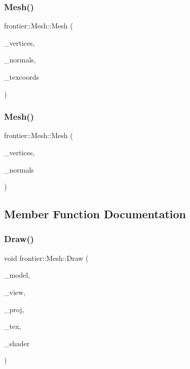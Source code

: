 \subsubsection{\texorpdfstring{Mesh()}{Mesh()}\hspace{0.1cm}{\footnotesize\ttfamily [1/2]}}
{\footnotesize\ttfamily frontier\+::\+Mesh\+::\+Mesh (\begin{DoxyParamCaption}\item[{std\+::vector$<$ G\+Lfloat $>$}]{\+\_\+vertices,  }\item[{std\+::vector$<$ G\+Lfloat $>$}]{\+\_\+normals,  }\item[{std\+::vector$<$ G\+Lfloat $>$}]{\+\_\+texcoords }\end{DoxyParamCaption})}

\mbox{\label{classfrontier_1_1_mesh_a5bc251528ec00975e49ba3f156955a3f}} 
\subsubsection{\texorpdfstring{Mesh()}{Mesh()}\hspace{0.1cm}{\footnotesize\ttfamily [2/2]}}
{\footnotesize\ttfamily frontier\+::\+Mesh\+::\+Mesh (\begin{DoxyParamCaption}\item[{std\+::vector$<$ G\+Lfloat $>$}]{\+\_\+vertices,  }\item[{std\+::vector$<$ G\+Lfloat $>$}]{\+\_\+normals }\end{DoxyParamCaption})}



\subsection{Member Function Documentation}
\mbox{\label{classfrontier_1_1_mesh_a37daa84e24b750bb8b488794fa34ed1e}} 
\subsubsection{\texorpdfstring{Draw()}{Draw()}}
{\footnotesize\ttfamily void frontier\+::\+Mesh\+::\+Draw (\begin{DoxyParamCaption}\item[{glm\+::mat4}]{\+\_\+model,  }\item[{glm\+::mat4}]{\+\_\+view,  }\item[{glm\+::mat4}]{\+\_\+proj,  }\item[{std\+::shared\+\_\+ptr$<$ \hyperlink{classfrontier_1_1_texture}{Texture} $>$}]{\+\_\+tex,  }\item[{std\+::shared\+\_\+ptr$<$ \hyperlink{classfrontier_1_1_shader}{Shader} $>$}]{\+\_\+shader }\end{DoxyParamCaption})}



